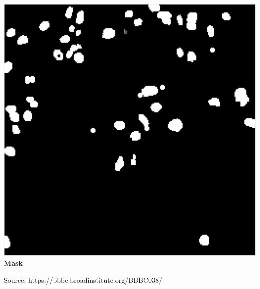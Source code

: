 \begin{frame}
\begin{minipage}[h!]{0.40\textwidth}
    \centering
    \includegraphics[scale=0.13]{./img/3_benchmark/mask_2.png}
    \textbf{Mask}
  \end{minipage}

  \bigskip

  Source: https://bbbc.broadinstitute.org/BBBC038/

\end{frame}

\def\slidetitle{Accuracy for 'nuclei segmentation'}

